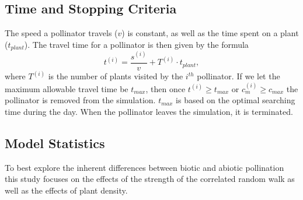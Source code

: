 \subsection{Time and Stopping Criteria}

The speed a pollinator travels ($v$) is constant, as well as the time spent on a
plant ($t_{plant}$).  The travel time for a pollinator is then given by the
formula
\[
  t^{\left(i\right)} = \frac{s^{\left(i\right)}}{v} + T^{\left(i\right)} \cdot t_{plant},
\]
where $T^{\left(i\right)}$ is the number of plants visited by the $i^{th}$
pollinator. If we let the maximum allowable travel time be $t_{max}$, then once
$t^{\left(i\right)} \geq t_{max}$ or $c^{\left(i\right)}_m \geq c_{max}$ the
pollinator is removed from the simulation. $t_{max}$ is based on the optimal
searching time during the day.  When the pollinator leaves the simulation, it is
terminated.

\subsection{Model Statistics}

To best explore the inherent differences between biotic and abiotic pollination
this study focuses on the effects of the strength of the correlated random walk
as well as the effects of plant density.

